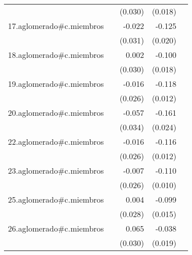 {\begin{longtable}{l*{4}{D{.}{.}{-1}}}
            &                     &     (0.030)         &     (0.018)         &                     \\
\addlinespace
17.aglomerado#c.miembros&                     &      -0.022         &      -0.125\sym{***}&                     \\
            &                     &     (0.031)         &     (0.020)         &                     \\
\addlinespace
18.aglomerado#c.miembros&                     &       0.002         &      -0.100\sym{***}&                     \\
            &                     &     (0.030)         &     (0.018)         &                     \\
\addlinespace
19.aglomerado#c.miembros&                     &      -0.016         &      -0.118\sym{***}&                     \\
            &                     &     (0.026)         &     (0.012)         &                     \\
\addlinespace
20.aglomerado#c.miembros&                     &      -0.057         &      -0.161\sym{***}&                     \\
            &                     &     (0.034)         &     (0.024)         &                     \\
\addlinespace
22.aglomerado#c.miembros&                     &      -0.016         &      -0.116\sym{***}&                     \\
            &                     &     (0.026)         &     (0.012)         &                     \\
\addlinespace
23.aglomerado#c.miembros&                     &      -0.007         &      -0.110\sym{***}&                     \\
            &                     &     (0.026)         &     (0.010)         &                     \\
\addlinespace
25.aglomerado#c.miembros&                     &       0.004         &      -0.099\sym{***}&                     \\
            &                     &     (0.028)         &     (0.015)         &                     \\
\addlinespace
26.aglomerado#c.miembros&                     &       0.065\sym{*}  &      -0.038\sym{*}  &                     \\
            &                     &     (0.030)         &     (0.019)         &                     \\

\end{longtable}}
